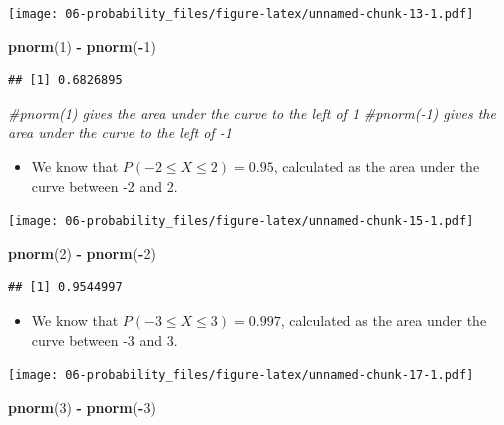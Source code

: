 \documentclass[
]{book}
\newenvironment{Shaded}{\begin{snugshade}}{\end{snugshade}}
\newcommand{\CommentTok}[1]{\textcolor[rgb]{0.56,0.35,0.01}{\textit{#1}}}
\newcommand{\DecValTok}[1]{\textcolor[rgb]{0.00,0.00,0.81}{#1}}
\newcommand{\KeywordTok}[1]{\textcolor[rgb]{0.13,0.29,0.53}{\textbf{#1}}}
\newcommand{\NormalTok}[1]{#1}
\newcommand{\OperatorTok}[1]{\textcolor[rgb]{0.81,0.36,0.00}{\textbf{#1}}}
\newcommand{\StringTok}[1]{\textcolor[rgb]{0.31,0.60,0.02}{#1}}
\providecommand{\tightlist}{%
  \setlength{\itemsep}{0pt}\setlength{\parskip}{0pt}}
\begin{document}
\texttt{[image: 06-probability\_files/figure-latex/unnamed-chunk-13-1.pdf]}

\begin{Shaded}
\begin{Highlighting}[]
\KeywordTok{pnorm}\NormalTok{(}\DecValTok{1}\NormalTok{) }\OperatorTok{-}\StringTok{ }\KeywordTok{pnorm}\NormalTok{(}\OperatorTok{-}\DecValTok{1}\NormalTok{) }
\end{Highlighting}
\end{Shaded}

\begin{verbatim}
## [1] 0.6826895
\end{verbatim}

\begin{Shaded}
\begin{Highlighting}[]
\CommentTok{#pnorm(1) gives the area under the curve to the left of 1}
\CommentTok{#pnorm(-1) gives the area under the curve to the left of -1}
\end{Highlighting}
\end{Shaded}

\begin{itemize}
\tightlist
\item
  We know that \(P(-2\leq X \leq 2) = 0.95\), calculated as the area under the curve between -2 and 2.
\end{itemize}

\texttt{[image: 06-probability\_files/figure-latex/unnamed-chunk-15-1.pdf]}

\begin{Shaded}
\begin{Highlighting}[]
\KeywordTok{pnorm}\NormalTok{(}\DecValTok{2}\NormalTok{) }\OperatorTok{-}\StringTok{ }\KeywordTok{pnorm}\NormalTok{(}\OperatorTok{-}\DecValTok{2}\NormalTok{)}
\end{Highlighting}
\end{Shaded}

\begin{verbatim}
## [1] 0.9544997
\end{verbatim}

\begin{itemize}
\tightlist
\item
  We know that \(P(-3\leq X \leq 3) = 0.997\), calculated as the area under the curve between -3 and 3.
\end{itemize}

\texttt{[image: 06-probability\_files/figure-latex/unnamed-chunk-17-1.pdf]}

\begin{Shaded}
\begin{Highlighting}[]
\KeywordTok{pnorm}\NormalTok{(}\DecValTok{3}\NormalTok{) }\OperatorTok{-}\StringTok{ }\KeywordTok{pnorm}\NormalTok{(}\OperatorTok{-}\DecValTok{3}\NormalTok{)}
\end{Highlighting}
\end{Shaded}
\end{document}
